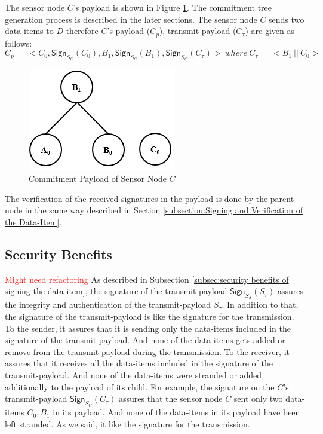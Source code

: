 	The sensor node $C$'s payload is shown in Figure \ref{fig:Commitment payload of C}.
	The commitment tree generation process is described in the later sections. 
	The sensor node $C$ sends two data-items to $D$ therefore $C$'s payload ($C_{p}$), transmit-payload ($C_{\tau}$) are given as follows:
	\begin{equation}
		 	C_{p} =\ <C_{0}, \textsf{Sign}_{S_{C}}(C_{0}), B_{1}, \textsf{Sign}_{S_{C}}(B_{1}), \textsf{Sign}_{S_{C}}(C_{\tau}) >\ where\ C_{\tau} =\ <B_{1}\ ||\ C_{0}>
	\end{equation}
	\begin{figure}[h!]
		\centering
		\includegraphics[scale = 1]{images/commitment-payload-of-C.png}
		\caption{Commitment Payload of Sensor Node $C$}
		\label{fig:Commitment payload of C}
	\end{figure}
	The verification of the received signatures in the payload is done by the parent node in the same way described in Section \ref{subsection:Signing and Verification of the Data-Item}.

	\subsection{Security Benefits}
		\textcolor{red}{Might need refactoring}
		As described in Subsection \ref{subsec:security benefits of signing the data-item}, the signature of the transmit-payload $\textsf{Sign}_{S_{S}}(S_{\tau})$ assures the integrity and authentication of the transmit-payload $S_{\tau}$.
		In addition to that, the signature of the transmit-payload is like the signature for the transmission.
		To the sender, it assures that it is sending only the data-items included in the signature of the transmit-payload.
		And none of the data-items gets added or remove from the transmit-payload during the transmission. 
		To the receiver, it assures that it receives all the data-items included in the signature of the transmit-payload. 
		And none of the data-items were stranded or added additionally to the payload of its child.
		For example, the signature on the $C$'s transmit-payload $\textsf{Sign}_{S_{C}}(C_{\tau})$ assures that the sensor node $C$ sent only two data-items $C_{0},B_{1}$ in its payload.
		And none of the data-items in its payload have been left stranded.
		As we said, it like the signature for the transmission.

